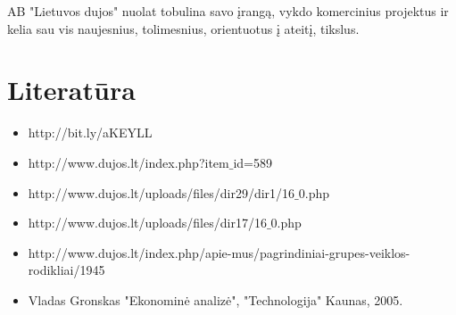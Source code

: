\documentclass[11pt,a4paper]{article}
\begin{document}
AB "Lietuvos dujos" nuolat tobulina savo įrangą, vykdo komercinius projektus ir 
kelia sau vis naujesnius, tolimesnius, orientuotus į ateitį, tikslus.\\

\newpage
\section*{Literatūra}
\begin{itemize}
	\item http://bit.ly/aKEYLL
	\item http://www.dujos.lt/index.php?item$\_$id=589
	\item http://www.dujos.lt/uploads/files/dir29/dir1/16$\_$0.php
	\item http://www.dujos.lt/uploads/files/dir17/16$\_$0.php
	\item http://www.dujos.lt/index.php/apie-mus/pagrindiniai-grupes-veiklos-rodikliai/1945
	\item Vladas Gronskas "Ekonominė analizė", "Technologija" Kaunas, 2005.
\end{itemize}
\newpage
\end{document}
